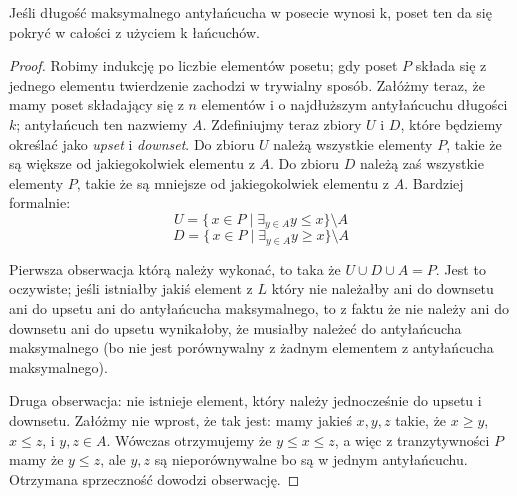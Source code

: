  \begin{theorem}
      Jeśli długość maksymalnego antyłańcucha w posecie wynosi k, poset ten da się pokryć w całości z użyciem k łańcuchów.
    \end{theorem}

    \begin{proof}
        Robimy indukcję po liczbie elementów posetu; gdy poset $P$ składa się z jednego elementu twierdzenie zachodzi w trywialny sposób. Załóżmy teraz, że mamy poset składający się z $n$ elementów i o najdłuższym antyłańcuchu długości $k$; antyłańcuch ten nazwiemy $A$. Zdefiniujmy teraz zbiory $U$ i $D$, które będziemy określać jako \textit{upset} i \textit{downset}. Do zbioru $U$ należą wszystkie elementy $P$, takie że są większe od jakiegokolwiek elementu z $A$. Do zbioru $D$ należą zaś wszystkie elementy $P$, takie że są mniejsze od jakiegokolwiek elementu z $A$. Bardziej formalnie:
        \begin{equation*}
            U = \{\,x \in P \mid \exists_{y \in A}  y \leq x \} \setminus A
        \end{equation*}
        \begin{equation*}
            D = \{\,x \in P \mid \exists_{y \in A} y \geq x \} \setminus A
        \end{equation*}

        Pierwsza obserwacja którą należy wykonać, to taka że $U \cup D \cup A = P$. Jest to oczywiste; jeśli istniałby jakiś element z $L$ który nie należałby ani do downsetu ani do upsetu ani do antyłańcucha maksymalnego, to z faktu że nie należy ani do downsetu ani do upsetu wynikałoby, że musiałby należeć do antyłańcucha maksymalnego (bo nie jest porównywalny z żadnym elementem z antyłańcucha maksymalnego).
        
        Druga obserwacja: nie istnieje element, który należy jednocześnie do upsetu i downsetu. Załóżmy nie wprost, że tak jest: mamy jakieś $x, y, z$ takie, że $x \geq y$,  $x \leq z$, i $y,z \in A$. Wówczas otrzymujemy że $y \leq x \leq z$, a więc z tranzytywności $P$ mamy że $y \leq z$, ale $y, z$ są nieporównywalne bo są w jednym antyłańcuchu. Otrzymana sprzeczność dowodzi obserwację. 


\end{proof}
